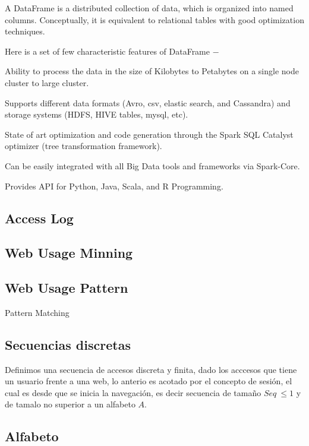 A DataFrame is a distributed collection of data, which is organized into named columns. Conceptually, it is equivalent to relational tables with good optimization techniques.

Here is a set of few characteristic features of DataFrame −

Ability to process the data in the size of Kilobytes to Petabytes on a single node cluster to large cluster.

Supports different data formats (Avro, csv, elastic search, and Cassandra) and storage systems (HDFS, HIVE tables, mysql, etc).

State of art optimization and code generation through the Spark SQL Catalyst optimizer (tree transformation framework).

Can be easily integrated with all Big Data tools and frameworks via Spark-Core.

Provides API for Python, Java, Scala, and R Programming.



\subsection{Access Log}



\subsection{Web Usage Minning}

\subsection{Web Usage Pattern}

Pattern Matching



\subsection{Secuencias discretas}

Definimos una secuencia de accesos discreta y finita, dado los acccesos que tiene un usuario frente a una web, lo anterio es acotado por el concepto de sesión, el cual es desde que se inicia la navegación, es decir secuencia de tamaño $Seq\ \leq 1$ y de tamalo no superior a un alfabeto $A$.


\subsection{Alfabeto}

